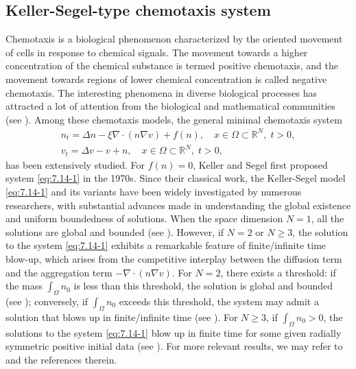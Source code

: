 \documentclass[reqno]{amsart}
\begin{document}
\subsection*{Keller-Segel-type chemotaxis system}  
Chemotaxis is a biological phenomenon characterized by the oriented movement of 
cells in response to chemical signals. The movement towards a higher concentration of 
the chemical substance is termed positive chemotaxis, and the movement towards regions 
of lower chemical concentration is called negative chemotaxis.
The interesting phenomena in diverse biological processes has attracted a lot of 
attention from the biological and mathematical communities  (see \cite{Hillen}). 
Among these chemotaxis models, the general minimal chemotaxis system
 \begin{equation}\label{eq:7.14-1}
\begin{gathered}
n_t = \Delta n - \xi \nabla \cdot (n \nabla v)+f(n), \quad
 x \in \Omega\subset \mathbb{R}^N,\; t > 0, \\
v_t = \Delta v  - v+ n , \quad x \in \Omega\subset \mathbb{R}^N,\; t > 0,
\end{gathered}
\end{equation}
has been extensively studied. 
For $f(n)= 0$, Keller and Segel  \cite{Keller-1970,Keller-1970-2} first proposed 
system \eqref{eq:7.14-1} in the 1970s. 
Since their classical work, the Keller-Segel model \eqref{eq:7.14-1} and its variants 
have been widely investigated by numerous researchers, with substantial advances made 
in understanding the global existence and uniform boundedness of solutions.
When the space dimension $ N = 1 $, all the solutions are global and bounded 
(see \cite{Osaki-2001}). However, if $ N=2$ or $ N \geq 3 $, the solution to the system 
\eqref{eq:7.14-1} exhibits a remarkable feature of finite/infinite time blow-up, 
which arises from the competitive interplay between the diffusion term and the 
aggregation term $-\nabla \cdot (n \nabla v)$. For $ N = 2 $, there exists a threshold: 
if the mass $\int_\Omega n_0$ is less than this threshold, the solution is global and 
bounded (see \cite{G-3, G-4}); conversely, if $\int_\Omega n_0$ exceeds this threshold, 
the system may admit a solution that blows up in finite/infinite time (see \cite{G-5, G-6}). For $N \geq 3$, if $\int_\Omega n_0 > 0$, the solutions to the system \eqref{eq:7.14-1} blow up in finite time for some given radially symmetric positive initial data (see \cite{Herrero-1997, Dolbeault-2004, Nagai}). For more relevant results, we may refer to \cite{G-8, G-9, G-10} and the references therein.
\end{document}
